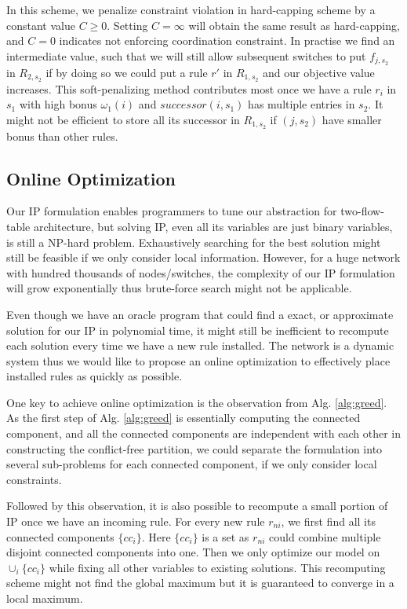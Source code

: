 \documentclass[10pt,twocolumn,letterpaper]{article}
\begin{document}
In this scheme, we penalize constraint violation in hard-capping scheme by a constant value $C\geq 0$. Setting $C = \infty$ will obtain the same result as hard-capping, and $C=0$ indicates not enforcing coordination constraint. In practise we find an intermediate value, such that we will still allow subsequent switches to put $f_{j,s_2}$ in $R_{2,s_2}$ if by doing so we could put a rule $r'$ in $R_{1,s_2}$ and our objective value increases. This soft-penalizing method contributes most once we have a rule $r_i$ in $s_1$ with high bonus $\omega_1(i)$ and $successor(i,s_1)$ has multiple entries in $s_2$. It might not be efficient to store all its successor in $R_{1,s_2}$ if $(j,s_2)$ have smaller bonus than other rules.   

\subsection{Online Optimization}
Our IP formulation enables programmers to tune our abstraction for two-flow-table architecture, but solving IP, even all its variables are just binary variables, is still a NP-hard problem. Exhaustively searching for the best solution might still be feasible if we only consider local information. However, for a huge network with hundred thousands of nodes/switches, the complexity of our IP formulation will grow exponentially thus brute-force search might not be applicable.

Even though we have an oracle program that could find a exact, or approximate solution for our IP in polynomial time, it might still be inefficient to recompute each solution every time we have a new rule installed. The network is a dynamic system thus we would like to propose an online optimization to effectively place installed rules as quickly as possible. 

One key to achieve online optimization is the observation from Alg. \ref{alg:greed}. As the first step of Alg. \ref{alg:greed} is essentially computing the connected component, and all the connected components are independent with each other in constructing the conflict-free partition, we could separate the formulation into several sub-problems for each connected component, if we only consider local constraints.

Followed by this observation, it is also possible to recompute a small portion of IP once we have an incoming rule. For every new rule $r_{ni}$, we first find all its connected components $\{cc_i\}$. Here $\{cc_i\}$ is a set as $r_{ni}$ could combine multiple disjoint connected components into one. Then we only optimize our model on $\cup_{i}\{cc_i\}$ while fixing all other variables to existing solutions. This recomputing scheme might not find the global maximum but it is guaranteed to converge in a local maximum.
\end{document}

